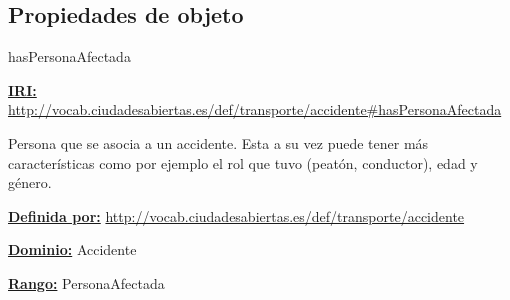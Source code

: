 \subsection{Propiedades de objeto}




\begin{mybox}{hasPersonaAfectada}
\begin{flushleft}
\underline{\textbf{IRI:}}
\url{http://vocab.ciudadesabiertas.es/def/transporte/accidente#hasPersonaAfectada}
\newline

Persona que se asocia a un accidente. Esta a su vez puede tener más características como por ejemplo el rol que tuvo (peatón, conductor), edad y género.
\newline

\underline{\textbf{Definida por:}}
\newline \url{http://vocab.ciudadesabiertas.es/def/transporte/accidente}
\newline

\underline{\textbf{Dominio:}} 	
\newline Accidente
\newline

\underline{\textbf{Rango:}} 
\newline PersonaAfectada

\end{flushleft}
\end{mybox}




